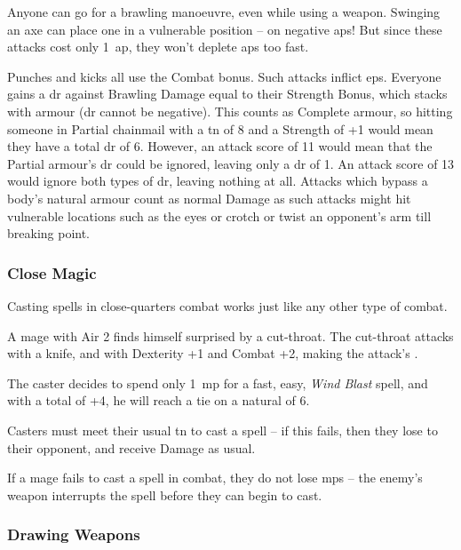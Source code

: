\begin{multicols}{2}
Anyone can go for a brawling manoeuvre, even while using a weapon.
Swinging an axe can place one in a vulnerable position -- on negative \glspl{ap}!
But since these attacks cost only 1~\gls{ap}, they won't deplete \glspl{ap} too fast.

Punches and kicks all use the Combat bonus.
Such attacks inflict \glspl{ep}.
Everyone gains a \gls{dr} against Brawling Damage equal to their Strength Bonus, which stacks with armour (\gls{dr} cannot be negative).
This counts as Complete armour, so hitting someone in Partial chainmail with a \gls{tn} of 8 and a Strength of +1 would mean they have a total \gls{dr} of 6.
However, an attack score of 11 would mean that the Partial armour's \gls{dr} could be ignored, leaving only a \gls{dr} of 1.
An attack score of 13 would ignore both types of \gls{dr}, leaving nothing at all.
Attacks which bypass a body's natural armour count as normal Damage as such attacks might hit vulnerable locations such as the eyes or crotch or twist an opponent's arm till breaking point.

\subsubsection[Close Magic: Casters roll vs the enemy's standard Attack score]{Close Magic}

Casting spells in close-quarters combat works just like any other type of combat.

\begin{exampletext}
  A mage with Air 2 finds himself surprised by a cut-throat.
  The cut-throat attacks with a knife, and with Dexterity +1 and Combat +2, making the attack's \tn[10].

  The caster decides to spend only 1~\gls{mp} for a fast, easy, \textit{Wind Blast} spell, and with a  total of +4, he will reach a tie on a \gls{natural} of 6.
\end{exampletext}

Casters must meet their usual \gls{tn} to cast a spell -- if this fails, then they lose to their opponent, and receive Damage as usual.

If a mage fails to cast a spell in combat, they do not lose \glspl{mp} -- the enemy's weapon interrupts the spell before they can begin to cast.

\subsubsection[Drawing Weapon -- Cost: 1 \glsentrytext{ap}]{Drawing Weapons}


\end{multicols}
